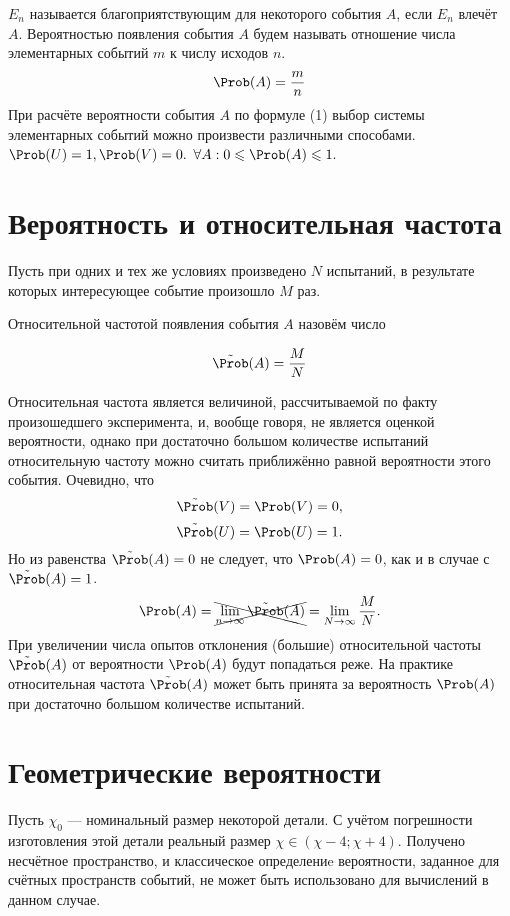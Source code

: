  $E_n$ называется благоприятствующим для некоторого события $A$, если $E_n$ влечёт $A$.
 Вероятностью появления события $A$ будем называть отношение числа элементарных событий $m$ к числу исходов $n$.
\begin{equation}
  \Prob (A) = \frac{m}{n} \hfill
\end{equation}
\addition При расчёте вероятности события $A$ по формуле (1) выбор системы элементарных событий можно произвести различными способами.
\conclusion $\Prob(U) = 1, \Prob(V) = 0.$
\conclusion $\forall A: 0 \leqslant \Prob(A) \leqslant 1.$
\section{Вероятность и относительная частота}
\begin{definition}
  Пусть при одних и тех же условиях произведено $N$ испытаний, в результате которых интересующее событие произошло $M$ раз.
\end{definition}

Относительной частотой появления события $A$ назовём число

\begin{equation}
  \tilde{\Prob}(A) = \frac{M}{N}
\end{equation}

 Относительная частота является величиной, рассчитываемой по факту произошедшего эксперимента, и, вообще говоря, не является оценкой вероятности, однако при достаточно большом количестве испытаний относительную частоту можно считать приближённо равной вероятности этого события.
Очевидно, что
$$\tilde{\Prob}(V) = \Prob(V) = 0,$$
$$\tilde{\Prob}(U) = \Prob(U) = 1.$$
Но из равенства $\tilde{\Prob}(A) = 0$ не следует, что $\Prob(A) = 0$, как и в случае с  $\tilde{\Prob}(A) = 1$.
\[
  \Prob(A) = \xcancel {\lim_{n\to\infty} \tilde{\Prob}(A)} = \lim_{N\to\infty} \frac{M}{N}.
\]
При увеличении числа опытов отклонения (большие) относительной частоты $\tilde{\Prob}(A)$ от вероятности $\Prob(A)$ будут попадаться реже. На практике относительная частота $\tilde{\Prob}(A)$ может быть принята за вероятность $\Prob(A)$ при достаточно большом количестве испытаний.

\section{Геометрические вероятности}
Пусть $\chi_0$ --- номинальный размер некоторой детали. С учётом погрешности изготовления этой детали реальный размер $\chi \in (\chi - 4; \chi + 4)$. Получено несчётное пространство, и классическое определениe вероятности, заданное для счётных пространств событий, не может быть использовано для вычислений в данном случае.

